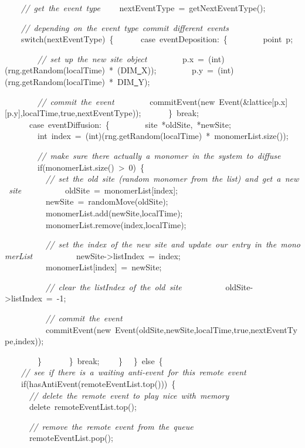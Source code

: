 {\ \ \ \ \textsl{//\ get\ the\ event\ type}
\ \ \ \ nextEventType\ =\ getNextEventType();

\ \ \ \ \textsl{//\ depending\ on\ the\ event\ type\ commit\ different\ events}
\ \ \ \ switch(nextEventType)\ \{
\ \ \ \ \ \ case\ eventDeposition:\ \{
\ \ \ \ \ \ \ \ point\ p;

\ \ \ \ \ \ \ \ \textsl{//\ set\ up\ the\ new\ site\ object}
\ \ \ \ \ \ \ \ p.x\ =\ (int)(rng.getRandom(localTime)\ *\ (DIM\underline\ X));
\ \ \ \ \ \ \ \ p.y\ =\ (int)(rng.getRandom(localTime)\ *\ DIM\underline\ Y);

\ \ \ \ \ \ \ \ \textsl{//\ commit\ the\ event}
\ \ \ \ \ \ \ \ commitEvent(new\ Event(\&lattice[p.x][p.y],localTime,true,nextEventType));
\ \ \ \ \ \ \}\ break;
\ \ \ \ \ \ case\ eventDiffusion:\ \{
\ \ \ \ \ \ \ \ site\ *oldSite,\ *newSite;
\ \ \ \ \ \ \ \ int\ index\ =\ (int)(rng.getRandom(localTime)\ *\ monomerList.size());

\ \ \ \ \ \ \ \ \textsl{//\ make\ sure\ there\ actually\ a\ monomer\ in\ the\ system\ to\ diffuse}
\ \ \ \ \ \ \ \ if(monomerList.size()\ >{}\ 0)\ \{
\ \ \ \ \ \ \ \ \ \ \textsl{//\ set\ the\ old\ site\ (random\ monomer\ from\ the\ list)\ and\ get\ a\ new\ site}
\ \ \ \ \ \ \ \ \ \ oldSite\ =\ monomerList[index];
\ \ \ \ \ \ \ \ \ \ newSite\ =\ randomMove(oldSite);
\ \ \ \ \ \ \ \ \ \ monomerList.add(newSite,localTime);
\ \ \ \ \ \ \ \ \ \ monomerList.remove(index,localTime);


\ \ \ \ \ \ \ \ \ \ \textsl{//\ set\ the\ index\ of\ the\ new\ site\ and\ update\ our\ entry\ in\ the\ monomerList}
\ \ \ \ \ \ \ \ \ \ newSite-{}>{}listIndex\ =\ index;
\ \ \ \ \ \ \ \ \ \ monomerList[index]\ =\ newSite;

\ \ \ \ \ \ \ \ \ \ \textsl{//\ clear\ the\ listIndex\ of\ the\ old\ site}
\ \ \ \ \ \ \ \ \ \ oldSite-{}>{}listIndex\ =\ -{}1;

\ \ \ \ \ \ \ \ \ \ \textsl{//\ commit\ the\ event}
\ \ \ \ \ \ \ \ \ \ commitEvent(new\ Event(oldSite,newSite,localTime,true,nextEventType,index));

\ \ \ \ \ \ \ \ \}
\ \ \ \ \ \ \}\ break;
\ \ \ \ \}
\ \ \}\ else\ \{
\ \ \ \ \textsl{//\ see\ if\ there\ is\ a\ waiting\ anti-{}event\ for\ this\ remote\ event}
\ \ \ \ if(hasAntiEvent(remoteEventList.top()))\ \{
\ \ \ \ \ \ \textsl{//\ delete\ the\ remote\ event\ to\ play\ nice\ with\ memory}
\ \ \ \ \ \ delete\ remoteEventList.top();

\ \ \ \ \ \ \textsl{//\ remove\ the\ remote\ event\ from\ the\ queue}
\ \ \ \ \ \ remoteEventList.pop();

}

